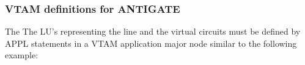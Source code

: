\documentclass[letterpaper,10pt,english]{sphinxmanual}
\begin{document}



\subsubsection{VTAM definitions for ANTIGATE}
\label{\detokenize{connectivity_guide:vtam-definitions-for-antigate}}
The The LU’s representing the line and the virtual circuits must be defined by APPL statements in a VTAM application major node similar to the following example:

\begin{sphinxVerbatim}[commandchars=\\\{\}]
  
  
         

\end{sphinxVerbatim}
\end{document}

